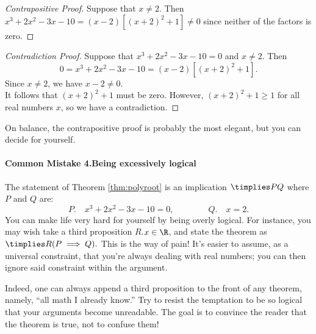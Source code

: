 \begin{proof}[Contrapositive Proof]
Suppose that $x\neq 2$. Then $x^3+2x^2-3x-10=(x-2)[(x+2)^2+1]\neq 0$ since neither of the factors is zero.
\end{proof}

\begin{proof}[Contradiction Proof]
Suppose that $x^3+2x^2-3x-10=0$ and $x\neq 2$. Then
\[0=x^3+2x^2-3x-10=(x-2)[(x+2)^2+1].\]
Since $x\neq 2$, we have $x-2\neq 0$.\\
It follows that $(x+2)^2+1$ must be zero. However, $(x+2)^2+1\ge 1$ for all real numbers $x$, so we have a contradiction.
\end{proof}

\noindent On balance, the contrapositive proof is probably the most elegant, but you can decide for yourself.


\paragraph{Common Mistake 4.\quad Being excessively logical}

The statement of Theorem \ref{thm:polyroot} is an implication $\timplies PQ$ where $P$ and $Q$ are:
\[P.\quad x^3+2x^2-3x-10=0, \qquad\qquad Q.\quad x=2.\]
You can make life very hard for yourself by being overly logical. For instance, you may wish take a third proposition $R$.\quad $x\in\R$, and state the theorem as $\timplies R{(P\implies Q).}$ This is the way of pain! It's easier to assume, as a universal constraint, that you're always dealing with real numbers; you can then ignore said constraint within the argument.

\noindent Indeed, one can always append a third proposition to the front of any theorem, namely, ``all math I already know.'' Try to resist the temptation to be so logical that your arguments become unreadable. The goal is to convince the reader that the theorem is true, not to confuse them!




